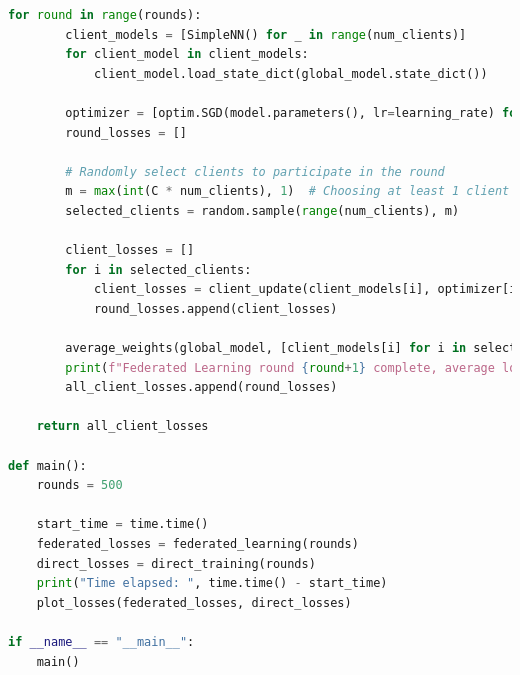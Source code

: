\documentclass[a4paper,12pt]{article}
\begin{document}
\begin{lstlisting}[language=Python, caption=Complete Code Implementation]
    for round in range(rounds):
        client_models = [SimpleNN() for _ in range(num_clients)]
        for client_model in client_models:
            client_model.load_state_dict(global_model.state_dict())
        
        optimizer = [optim.SGD(model.parameters(), lr=learning_rate) for model in client_models]
        round_losses = []

        # Randomly select clients to participate in the round
        m = max(int(C * num_clients), 1)  # Choosing at least 1 client
        selected_clients = random.sample(range(num_clients), m)

        client_losses = []
        for i in selected_clients:
            client_losses = client_update(client_models[i], optimizer[i], client_loaders[i], epoch)
            round_losses.append(client_losses)
        
        average_weights(global_model, [client_models[i] for i in selected_clients])
        print(f"Federated Learning round {round+1} complete, average loss:   {sum(client_losses)/len(client_losses)}")
        all_client_losses.append(round_losses)
    
    return all_client_losses

def main():
    rounds = 500

    start_time = time.time()
    federated_losses = federated_learning(rounds)
    direct_losses = direct_training(rounds)
    print("Time elapsed: ", time.time() - start_time)
    plot_losses(federated_losses, direct_losses)

if __name__ == "__main__":
    main()
  \end{lstlisting}


\end{document}
